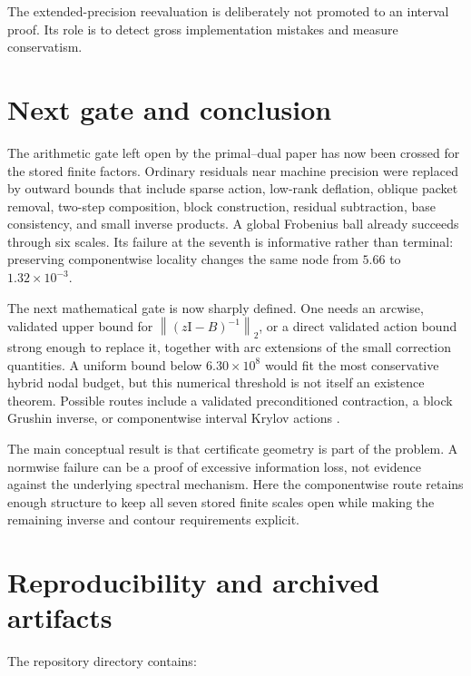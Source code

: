 \documentclass[11pt]{article}
\theoremstyle{definition}
\theoremstyle{remark}
\newcommand{\Id}{\mathrm I}
\newcommand{\norm}[1]{\left\lVert#1\right\rVert}
\begin{document}
The extended-precision reevaluation is deliberately not promoted to an
interval proof.  Its role is to detect gross implementation mistakes and
measure conservatism.

\section{Next gate and conclusion}
\label{sec:conclusion}

The arithmetic gate left open by the primal--dual paper has now been crossed
for the stored finite factors.  Ordinary residuals near machine precision
were replaced by outward bounds that include sparse action, low-rank
deflation, oblique packet removal, two-step composition, block
construction, residual subtraction, base consistency, and small inverse
products.  A global Frobenius ball already succeeds through six scales.
Its failure at the seventh is informative rather than terminal: preserving
componentwise locality changes the same node from \(5.66\) to
\(1.32\times10^{-3}\).

The next mathematical gate is now sharply defined.  One needs an arcwise,
validated upper bound for \(\norm{(z\Id-B)^{-1}}_2\), or a direct validated
action bound strong enough to replace it, together with arc extensions of
the small correction quantities.  A uniform bound below
\(6.30\times10^8\) would fit the most conservative hybrid nodal budget, but
this numerical threshold is not itself an existence theorem.  Possible
routes include a validated preconditioned contraction, a block Grushin
inverse, or componentwise interval Krylov actions
\citep{SjoestrandZworski2007,TrefethenEmbree2005,Rump2010}.

The main conceptual result is that certificate geometry is part of the
problem.  A normwise failure can be a proof of excessive information loss,
not evidence against the underlying spectral mechanism.  Here the
componentwise route retains enough structure to keep all seven stored
finite scales open while making the remaining inverse and contour
requirements explicit.

\appendix

\section{Reproducibility and archived artifacts}
\label{app:reproducibility}

The repository directory \citep{WangOutwardCode2026} contains:
\end{document}
